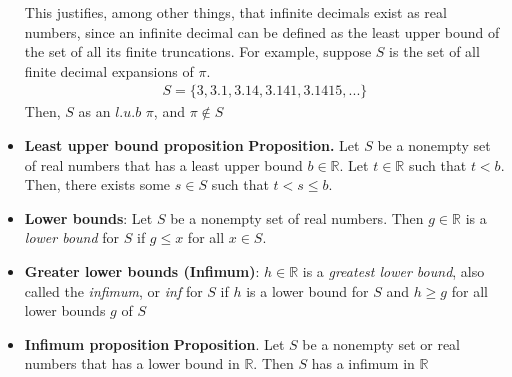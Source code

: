 \documentclass{report}
\begin{document}
\begin{itemize}
            \bigbreak \noindent 
            This justifies, among other things, that infinite decimals exist as real numbers, since an infinite decimal can be defined as the least upper bound of the set of all its finite truncations. For example, suppose $S$ is the set of all finite decimal expansions of $\pi$.
            \begin{align*}
                S = \{3,3.1,3.14,3.141, 3.1415,...\}
            \end{align*}
            Then, $S$ as an $l.u.b$ $\pi$, and $\pi\not\in S $
        \item \textbf{Least upper bound proposition}
            \bigbreak \noindent 
            \textbf{Proposition.} Let $S$ be a nonempty set of real numbers that has a least upper bound $b \in \mathbb{R}$. Let $t \in \mathbb{R}$ such that $t < b$. Then, there exists some $s \in S$ such that $t < s \leq b$.
        \item \textbf{Lower bounds}: Let $S$ be a nonempty set of real numbers. Then $g\in \mathbb{R}$ is a \textit{lower bound} for $S$ if $g \leq x$ for all $x\in S$.
        \item \textbf{Greater lower bounds (Infimum)}: $h\in \mathbb{R}$ is a \textit{greatest lower bound}, also called the \textit{infimum}, or \textit{inf} for $S$ if $ h$ is a lower bound for $S$ and $h \geq g$ for all lower bounds $g$ of $S$
        \item \textbf{Infimum proposition}
            \bigbreak \noindent 
            \textbf{Proposition}. Let $S$ be a nonempty set or real numbers that has a lower bound in $\mathbb{R}$. Then $S$ has a infimum in $\mathbb{R}$






\end{itemize}
\end{document}
